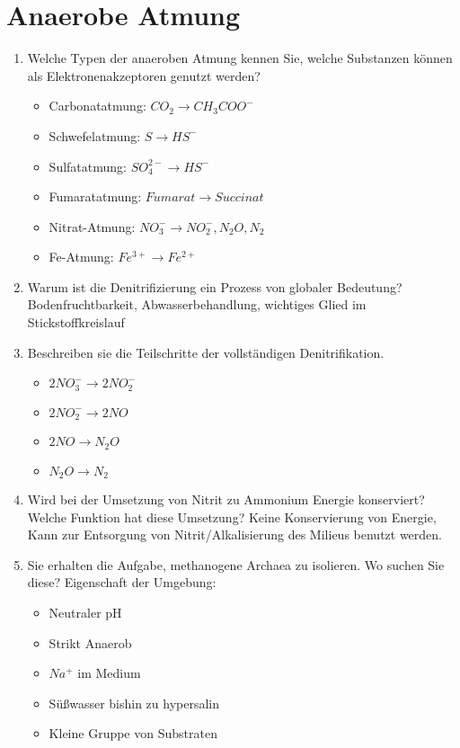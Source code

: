 
\section{Anaerobe Atmung}
\label{sec:anaerobeAtmung}
\begin{enumerate}
	\item Welche Typen der anaeroben Atmung kennen Sie, welche Substanzen können als Elektronenakzeptoren genutzt werden? 
		\begin{itemize}
			\item Carbonatatmung: $CO_2 \rightarrow CH_3COO^-$
			\item Schwefelatmung: $S \rightarrow HS^-$
			\item Sulfatatmung:   $SO_4^{2-} \rightarrow HS^-$
			\item Fumaratatmung:  $Fumarat \rightarrow Succinat$
			\item Nitrat-Atmung:  $NO_3^- \rightarrow NO_2^-, N_2O, N_2$
			\item Fe-Atmung:      $Fe^{3+} \rightarrow Fe^{2+}$
		\end{itemize}
	\item Warum ist die Denitrifizierung ein Prozess von globaler Bedeutung?
		Bodenfruchtbarkeit, Abwasserbehandlung, wichtiges Glied im Stickstoffkreislauf
	\item Beschreiben sie die Teilschritte der vollständigen Denitrifikation.
		\begin{itemize}
			\item $2NO_3^- \rightarrow 2 NO_2^-$
			\item $2 NO_2^- \rightarrow 2 NO$
			\item $2 NO \rightarrow N_2O$
			\item $N_2O \rightarrow N_2$
		\end{itemize}
	\item Wird bei der Umsetzung von Nitrit zu Ammonium Energie konserviert? Welche Funktion hat diese Umsetzung? Keine Konservierung von Energie, Kann zur Entsorgung von Nitrit/Alkalisierung des Milieus benutzt werden.	

	\item Sie erhalten die Aufgabe, methanogene Archaea zu isolieren. Wo suchen Sie diese?
		Eigenschaft der Umgebung: \\
		\begin{itemize}
			\item Neutraler pH
			\item Strikt Anaerob
			\item $Na^+$ im Medium
			\item S\"ußwasser bishin zu hypersalin
			\item Kleine Gruppe von Substraten
		\end{itemize}


\end{enumerate}
